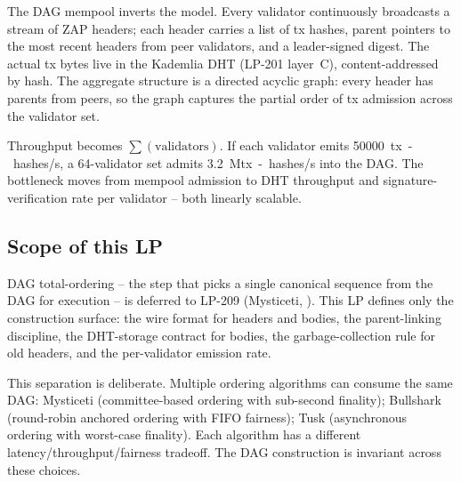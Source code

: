 The DAG mempool inverts the model. Every validator continuously
broadcasts a stream of ZAP headers; each header carries a list of
tx hashes, parent pointers to the most recent headers from peer
validators, and a leader-signed digest. The actual tx bytes live in
the Kademlia DHT (LP-201 layer~C), content-addressed by hash. The
aggregate structure is a directed acyclic graph: every header has
parents from peers, so the graph captures the partial order of tx
admission across the validator set.

Throughput becomes $\sum(\textrm{validators})$. If each validator
emits \SI{50000}{tx-hashes/s}, a 64-validator set admits
\SI{3.2}{\mega tx-hashes/s} into the DAG. The bottleneck moves from
mempool admission to DHT throughput and signature-verification rate
per validator -- both linearly scalable.

\subsection{Scope of this LP}

DAG total-ordering -- the step that picks a single canonical
sequence from the DAG for execution -- is deferred to LP-209
(Mysticeti, \cite{mysticeti2024}). This LP defines only the
construction surface: the wire format for headers and bodies, the
parent-linking discipline, the DHT-storage contract for bodies, the
garbage-collection rule for old headers, and the per-validator
emission rate.

This separation is deliberate. Multiple ordering algorithms can
consume the same DAG: Mysticeti (committee-based ordering with
sub-second finality); Bullshark \cite{bullshark2022} (round-robin
anchored ordering with FIFO fairness); Tusk (asynchronous ordering
with worst-case finality). Each algorithm has a different
latency/throughput/fairness tradeoff. The DAG construction is
invariant across these choices.
